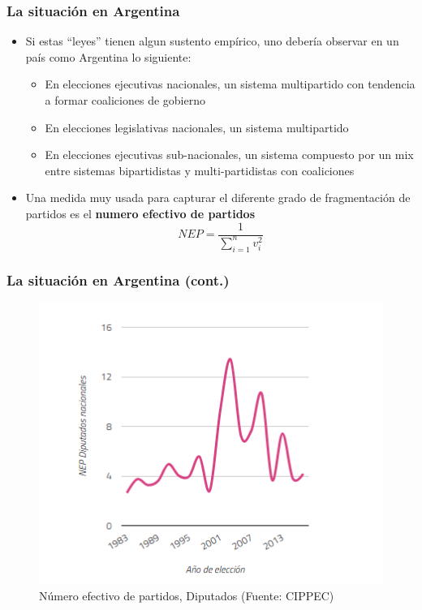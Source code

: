 \documentclass[a4paper,handout,mathserif,final,xcolor=dvipsnames,twocolumn]{beamer}
\begin{document}
  
  \begin{frame}\frametitle{La situación en Argentina}
    \begin{itemize}\itemsep 10pt
    \item Si estas ``leyes'' tienen algun sustento empírico, uno
      debería observar en un país como Argentina lo siguiente:
      \begin{itemize}\itemsep 5pt \smallskip
      \item En elecciones ejecutivas nacionales, un sistema
        multipartido con tendencia a formar coaliciones de gobierno
                \item En elecciones legislativas nacionales, un
                  sistema multipartido
                  \item En elecciones ejecutivas sub-nacionales, un
                    sistema compuesto por un mix entre sistemas
                    bipartidistas y multi-partidistas con coaliciones
                  \end{itemize}
\item Una medida muy usada para capturar el diferente grado de
  fragmentación de partidos es el \textbf{numero efectivo de partidos}
  \begin{equation*}
NEP=\frac{1}{\sum_{i=1}^{n}v_{i}^2}
    \end{equation*}
      \end{itemize}
  \end{frame}


  \begin{frame}\frametitle{La situación en Argentina (cont.)}
 \begin{figure}[htbp]
    \centering 
    \includegraphics[scale=0.675]{grafico2}
    \caption{Número efectivo de partidos, Diputados (Fuente: CIPPEC)}
    \label{fig:1}
  \end{figure}
    \end{frame}
\end{document}

